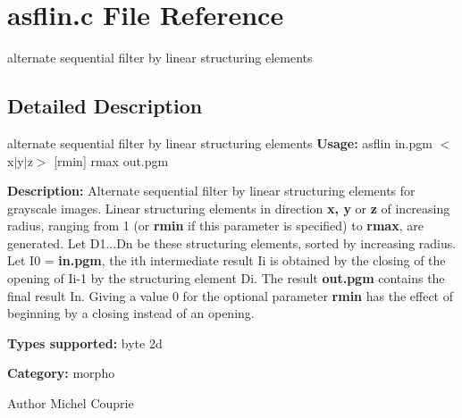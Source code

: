 \section{asflin.c File Reference}
\label{asflin_8c}


alternate sequential filter by linear structuring elements  




\subsection{Detailed Description}
alternate sequential filter by linear structuring elements {\bfseries Usage:} asflin in.pgm $<$x$|$y$|$z$>$ [rmin] rmax out.pgm

{\bfseries Description:} Alternate sequential filter by linear structuring elements for grayscale images. Linear structuring elements in direction {\bfseries x, y} or {\bfseries z} of increasing radius, ranging from 1 (or {\bfseries rmin} if this parameter is specified) to {\bfseries rmax}, are generated. Let D1...Dn be these structuring elements, sorted by increasing radius. Let I0 = {\bfseries in.pgm}, the ith intermediate result Ii is obtained by the closing of the opening of Ii-\/1 by the structuring element Di. The result {\bfseries out.pgm} contains the final result In. Giving a value 0 for the optional parameter {\bfseries rmin} has the effect of beginning by a closing instead of an opening.

{\bfseries Types supported:} byte 2d

{\bfseries Category:} morpho

\begin{DoxyAuthor}{Author}
Michel Couprie 
\end{DoxyAuthor}
